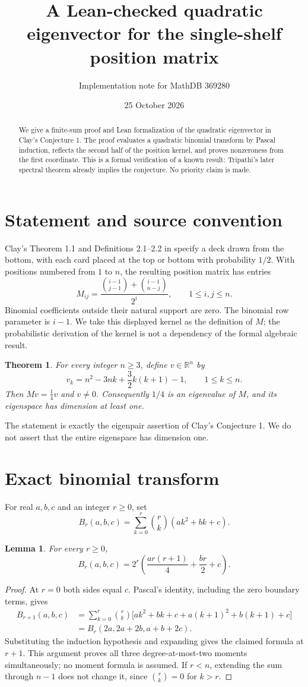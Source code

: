 \documentclass[11pt]{article}
\title{A Lean-checked quadratic eigenvector for the single-shelf position matrix}
\author{Implementation note for MathDB 369280}
\date{25 October 2026}
\newtheorem{theorem}{Theorem}
\newtheorem{lemma}{Lemma}
\begin{document}
\maketitle
\begin{abstract}
We give a finite-sum proof and Lean formalization of the quadratic eigenvector in Clay's Conjecture 1. The proof evaluates a quadratic binomial transform by Pascal induction, reflects the second half of the position kernel, and proves nonzeroness from the first coordinate. This is a formal verification of a known result: Tripathi's later spectral theorem already implies the conjecture. No priority claim is made.
\end{abstract}

\section{Statement and source convention}
Clay's Theorem 1.1 and Definitions 2.1--2.2 in \cite{clay} specify a deck drawn from the bottom, with each card placed at the top or bottom with probability $1/2$. With positions numbered from $1$ to $n$, the resulting position matrix has entries
\[
 M_{ij}=\frac{\binom{i-1}{j-1}+\binom{i-1}{n-j}}{2^i},\qquad 1\leq i,j\leq n.
\]
Binomial coefficients outside their natural support are zero. The binomial row parameter is $i-1$. We take this displayed kernel as the definition of $M$; the probabilistic derivation of the kernel is not a dependency of the formal algebraic result.

\begin{theorem}\label{thm:main}
For every integer $n\geq3$, define $v\in\mathbb R^n$ by
\[
 v_k=n^2-3nk+\frac32 k(k+1)-1,\qquad 1\leq k\leq n.
\]
Then $Mv=\tfrac14v$ and $v\ne0$. Consequently $1/4$ is an eigenvalue of $M$, and its eigenspace has dimension at least one.
\end{theorem}
The statement is exactly the eigenpair assertion of Clay's Conjecture 1. We do not assert that the entire eigenspace has dimension one.

\section{Exact binomial transform}
For real $a,b,c$ and an integer $r\geq0$, set
\[
 B_r(a,b,c)=\sum_{k=0}^r\binom rk(ak^2+bk+c).
\]
\begin{lemma}\label{lem:binomial}
For every $r\geq0$,
\[
 B_r(a,b,c)=2^r\left(\frac{ar(r+1)}4+\frac{br}2+c\right).
\]
\end{lemma}
\begin{proof}
At $r=0$ both sides equal $c$. Pascal's identity, including the zero boundary terms, gives
\begin{align*}
 B_{r+1}(a,b,c)
 &=\sum_{k=0}^r\binom rk\bigl[ak^2+bk+c+a(k+1)^2+b(k+1)+c\bigr]\\
 &=B_r(2a,2a+2b,a+b+2c).
\end{align*}
Substituting the induction hypothesis and expanding gives the claimed formula at $r+1$. This argument proves all three degree-at-most-two moments simultaneously; no moment formula is assumed. If $r<n$, extending the sum through $n-1$ does not change it, since $\binom rk=0$ for $k>r$.
\end{proof}
\end{document}
